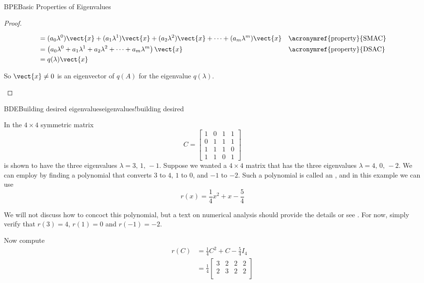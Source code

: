 \begin{subsect}{BPE}{Basic Properties of Eigenvalues}
\begin{proof}
\begin{para}
\begin{align*}
&=(a_0\lambda^0)\vect{x}+(a_1\lambda^1)\vect{x}+(a_2\lambda^2)\vect{x}+\cdots+(a_m\lambda^m)\vect{x}&&\text{\acronymref{property}{SMAC}}\\
&=\left(a_0\lambda^0+a_1\lambda^1+a_2\lambda^2+\cdots+a_m\lambda^m\right)\vect{x}&&\text{\acronymref{property}{DSAC}}\\
&=q(\lambda)\vect{x}
%
\end{align*}
\end{para}
%
\begin{para}So $\vect{x}\neq 0$ is an eigenvector of $q(A)$ for the eigenvalue $q(\lambda)$.\end{para}
%
\end{proof}
%
%
\begin{example}{BDE}{Building desired eigenvalues}{eigenvalues!building desired}
\begin{para}In  the $4\times 4$ symmetric matrix
%
\begin{equation*}
C=
\begin{bmatrix}
1 &  0 &  1 &  1\\
0 &  1 &  1 &  1\\
1 &  1 &  1 &  0\\
1 &  1 &  0 &  1
\end{bmatrix}
\end{equation*}
%
is shown to have the three eigenvalues $\lambda=3,\,1,\,-1$.  Suppose we wanted a $4\times 4$ matrix that has the three eigenvalues $\lambda=4,\,0,\,-2$.  We can employ  by finding a polynomial that converts $3$ to $4$, $1$ to $0$, and $-1$ to $-2$.  Such a polynomial is called an , and in this example we can use
%
\begin{equation*}
r(x)=\frac{1}{4}x^2+x-\frac{5}{4}
\end{equation*}
\end{para}
%
\begin{para}We will not discuss how to concoct this polynomial, but a text on numerical analysis should provide the details or see .  For now, simply verify that $r(3)=4$, $r(1)=0$ and $r(-1)=-2$.\end{para}
%
\begin{para}Now compute
%
\begin{align*}
r(C)&=\frac{1}{4}C^2+C-\frac{5}{4}I_4\\
&=
\frac{1}{4}
\begin{bmatrix}
3 &  2 &  2 &  2\\
2 &  3 &  2 &  2\\

\end{bmatrix}
\end{align*}
\end{para}
\end{example}
\end{subsect}
